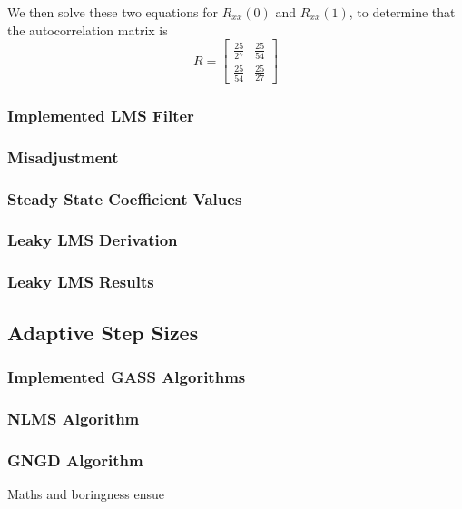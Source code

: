 \documentclass[./main.tex]{subfiles}
\begin{document}
We then solve these two equations for $ R_{xx}(0) $ and $ R_{xx}(1) $, to determine that the autocorrelation matrix is 
$$ R = \begin{bmatrix}
\frac{25}{27} & \frac{25}{54} \\
 \frac{25}{54} & \frac{25}{27}
\end{bmatrix}
$$

\subsubsection{Implemented LMS Filter}

\subsubsection{Misadjustment}

\subsubsection{Steady State Coefficient Values}

\subsubsection{Leaky LMS Derivation}

\subsubsection{Leaky LMS Results}


\subsection{Adaptive Step Sizes}

\subsubsection{Implemented GASS Algorithms}

\subsubsection{NLMS Algorithm}

\subsubsection{GNGD Algorithm}

Maths and boringness ensue

\end{document}
